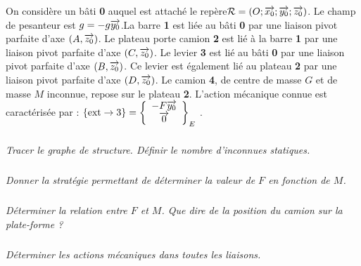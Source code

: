\documentclass[10pt,fleqn]{article} %
\begin{document}
\begin{multicols}{2}
\setcounter{exo}{0}
On considère un bâti \textbf{0} auquel est attaché le repère$\mathcal{R}=\left(O;\overrightarrow{x_0};\overrightarrow{y_0};\overrightarrow{z_0} \right)$. Le champ de pesanteur est $g=-g\overrightarrow{y_0}$.La barre \textbf{1} est liée au bâti \textbf{0} par une liaison pivot parfaite d’axe $\left(A,\overrightarrow{z_0}\right)$. Le plateau porte camion \textbf{2} est lié à la barre \textbf{1} par une liaison pivot parfaite d’axe $\left(C,\overrightarrow{z_0}\right)$. Le levier \textbf{3} est lié au bâti \textbf{0} par une liaison pivot parfaite d’axe $\left(B,\overrightarrow{z_0}\right)$. Ce levier est également lié au plateau \textbf{2} par une liaison pivot parfaite d’axe $\left(D,\overrightarrow{z_0}\right)$. Le camion \textbf{4}, de centre de masse $G$ et de masse $M$ inconnue, repose sur le plateau \textbf{2}.
L’action mécanique connue est caractérisée par : $\{\text{ext}\rightarrow 3\}=\left\{
\begin{array}{c}
-F\overrightarrow{y_0} \\
\overrightarrow{0} \\
\end{array}
\right\}_E$ .




\subparagraph{}\textit{Tracer le graphe de structure. Définir le nombre d'inconnues statiques.}

\subparagraph{}\textit{Donner la stratégie permettant de déterminer la valeur de $F$ en fonction de $M$.}

\subparagraph{}\textit{Déterminer la relation entre $F$ et $M$. Que dire de la position du camion sur la plate-forme ?}

\subparagraph{}\textit{Déterminer les actions mécaniques dans toutes les liaisons.}



\ifprof
\else
\end{multicols}
\fi

\end{document}

